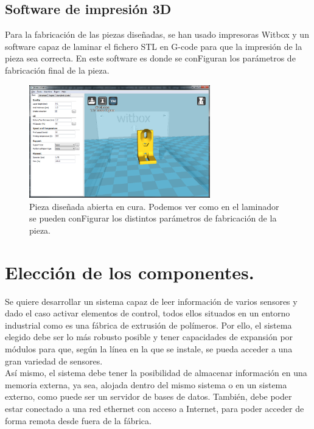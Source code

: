 \subsection{Software de impresión 3D}
Para la fabricación de las piezas diseñadas, se han usado impresoras Witbox y un software capaz de laminar el fichero STL en G-code para que la impresión de la pieza sea correcta. En este software es donde se conFiguran los parámetros de fabricación final de la pieza.

\begin{figure}[H]
    \centering
    \includegraphics[width=0.7\textwidth]{images/cura.png}
    \caption[Pieza diseñada abierta en cura.]{Pieza diseñada abierta en cura. Podemos ver como en el laminador se pueden conFigurar los distintos parámetros de fabricación de la pieza.}
    \label{fig:cura}
\end{figure}


\section{Elección de los componentes.}

Se quiere desarrollar un sistema capaz de leer información de varios sensores y dado el caso activar elementos de control, todos ellos situados en un entorno industrial como es una fábrica de extrusión de polímeros. Por ello, el sistema elegido debe ser lo más robusto posible y tener capacidades de expansión por módulos para que, según la línea en la que se instale, se pueda acceder a una gran variedad de sensores.\\ 

Así mismo, el sistema debe tener la posibilidad de almacenar información en una memoria externa, ya sea, alojada dentro del mismo sistema o en un sistema externo, como puede ser un servidor de bases de datos. También, debe poder estar conectado a una red ethernet con acceso a Internet, para poder acceder de forma remota desde fuera de la fábrica.\\ 

